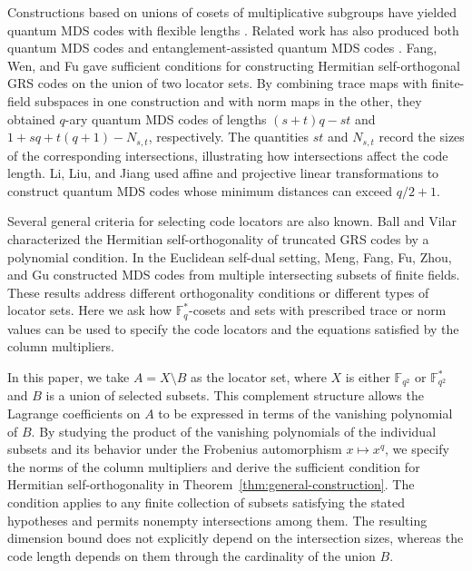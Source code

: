 \documentclass[preprint,12pt,a4paper]{elsarticle}
\begin{document}
Constructions based on unions of cosets of multiplicative subgroups have yielded quantum MDS codes with flexible lengths \cite{FangLuo2020,JinLuoFangQu2022}. Related work has also produced both quantum MDS codes and entanglement-assisted quantum MDS codes \cite{TianLiWuChen2024}. Fang, Wen, and Fu \cite{FangWenFu2024} gave sufficient conditions for constructing Hermitian self-orthogonal GRS codes on the union of two locator sets. By combining trace maps with finite-field subspaces in one construction and with norm maps in the other, they obtained $q$-ary quantum MDS codes of lengths $(s+t)q-st$ and $1+sq+t(q+1)-N_{s,t}$, respectively. The quantities $st$ and $N_{s,t}$ record the sizes of the corresponding intersections, illustrating how intersections affect the code length. Li, Liu, and Jiang \cite{LiLiuJiang2026} used affine and projective linear transformations to construct quantum MDS codes whose minimum distances can exceed $q/2+1$.

Several general criteria for selecting code locators are also known. Ball and Vilar \cite{BallVilar2022} characterized the Hermitian self-orthogonality of truncated GRS codes by a polynomial condition. In the Euclidean self-dual setting, Meng, Fang, Fu, Zhou, and Gu \cite{MengFangFuZhouGu2026} constructed MDS codes from multiple intersecting subsets of finite fields. These results address different orthogonality conditions or different types of locator sets. Here we ask how $\mathbb F_q^{*}$-cosets and sets with prescribed trace or norm values can be used to specify the code locators and the equations satisfied by the column multipliers.

In this paper, we take $A=X\setminus B$ as the locator set, where $X$ is either $\mathbb F_{q^2}$ or $\mathbb F_{q^2}^{*}$ and $B$ is a union of selected subsets. This complement structure allows the Lagrange coefficients on $A$ to be expressed in terms of the vanishing polynomial of $B$. By studying the product of the vanishing polynomials of the individual subsets and its behavior under the Frobenius automorphism $x\mapsto x^q$, we specify the norms of the column multipliers and derive the sufficient condition for Hermitian self-orthogonality in Theorem~\ref{thm:general-construction}. The condition applies to any finite collection of subsets satisfying the stated hypotheses and permits nonempty intersections among them. The resulting dimension bound does not explicitly depend on the intersection sizes, whereas the code length depends on them through the cardinality of the union $B$.
\end{document}

